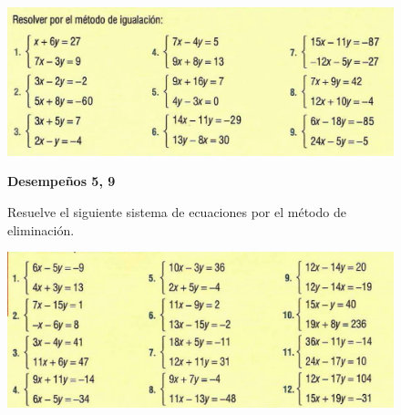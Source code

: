 \documentclass[spanish,12pt,a4paper]{article}
\begin{document}
\begin{itemize}
\begin{figure}[h]
		
		
			\includegraphics[scale = 0.4]{igualacion.png}
		\end{figure}

		\begin{figure}[h]
		\item \textbf{Desempeños 5, 9}
		
		Resuelve el siguiente sistema de ecuaciones por el método de eliminación.
		
		
			\includegraphics[scale = 0.4]{eliminacion.png}
		\end{figure}


		
	\end{itemize}
	
	
\end{document}
